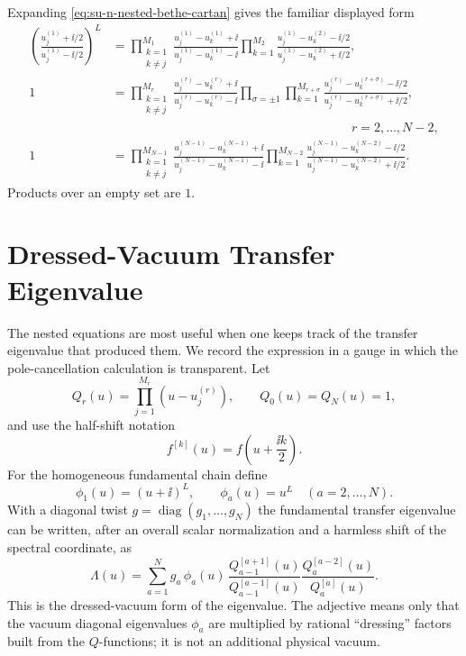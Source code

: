 Expanding \eqref{eq:su-n-nested-bethe-cartan} gives the familiar displayed
form
\begin{equation}
\begin{aligned}
  \left(
    \frac{u_j^{(1)}+\ii/2}{u_j^{(1)}-\ii/2}
  \right)^L
  &=
  \prod_{\substack{k=1\\ k\neq j}}^{M_1}
  \frac{u_j^{(1)}-u_k^{(1)}+\ii}
       {u_j^{(1)}-u_k^{(1)}-\ii}
  \prod_{k=1}^{M_2}
  \frac{u_j^{(1)}-u_k^{(2)}-\ii/2}
       {u_j^{(1)}-u_k^{(2)}+\ii/2},
\\
  1
  &=
  \prod_{\substack{k=1\\ k\neq j}}^{M_r}
  \frac{u_j^{(r)}-u_k^{(r)}+\ii}
       {u_j^{(r)}-u_k^{(r)}-\ii}
  \prod_{\sigma=\pm1}
  \prod_{k=1}^{M_{r+\sigma}}
  \frac{u_j^{(r)}-u_k^{(r+\sigma)}-\ii/2}
       {u_j^{(r)}-u_k^{(r+\sigma)}+\ii/2},
\\[-0.4em]
  &\hspace{19em} r=2,\ldots,N-2,
\\
  1
  &=
  \prod_{\substack{k=1\\ k\neq j}}^{M_{N-1}}
  \frac{u_j^{(N-1)}-u_k^{(N-1)}+\ii}
       {u_j^{(N-1)}-u_k^{(N-1)}-\ii}
  \prod_{k=1}^{M_{N-2}}
  \frac{u_j^{(N-1)}-u_k^{(N-2)}-\ii/2}
       {u_j^{(N-1)}-u_k^{(N-2)}+\ii/2}.
\end{aligned}
  \label{eq:su-n-nested-bethe}
\end{equation}
Products over an empty set are \(1\).

\section{Dressed-Vacuum Transfer Eigenvalue}

The nested equations are most useful when one keeps track of the transfer
eigenvalue that produced them.  We record the expression in a gauge in which
the pole-cancellation calculation is transparent.  Let
\[
  Q_r(u)=\prod_{j=1}^{M_r}(u-u_j^{(r)}),\qquad
  Q_0(u)=Q_N(u)=1,
\]
and use the half-shift notation
\[
  f^{[k]}(u)=f\!\left(u+\frac{\ii k}{2}\right).
\]
For the homogeneous fundamental chain define
\[
  \phi_1(u)=(u+\ii)^L,\qquad
  \phi_a(u)=u^L\quad(a=2,\ldots,N).
\]
With a diagonal twist \(g=\operatorname{diag}(g_1,\ldots,g_N)\) the
fundamental transfer eigenvalue can be written, after an overall scalar
normalization and a harmless shift of the spectral coordinate, as
\begin{equation}
  \Lambda(u)
  =
  \sum_{a=1}^{N}
  g_a\,\phi_a(u)\,
  \frac{Q_{a-1}^{[a+1]}(u)}{Q_{a-1}^{[a-1]}(u)}
  \frac{Q_a^{[a-2]}(u)}{Q_a^{[a]}(u)} .
  \label{eq:su-n-dressed-vacuum-eigenvalue}
\end{equation}
This is the dressed-vacuum form of the eigenvalue.  The adjective means only
that the vacuum diagonal eigenvalues \(\phi_a\) are multiplied by rational
``dressing'' factors built from the \(Q\)-functions; it is not an additional
physical vacuum.

